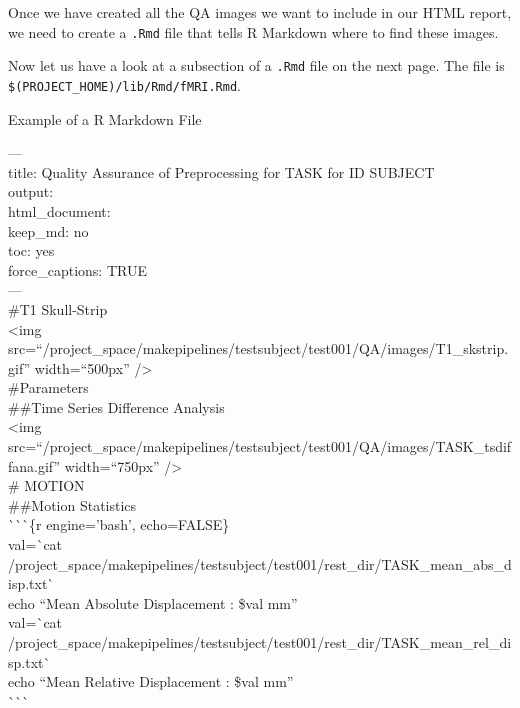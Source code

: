 Once we have created all the QA images we want to include in our HTML report, we need to create a \texttt{.Rmd} file that tells R Markdown where to find these images. 

Now let us have a look at a subsection of a \texttt{.Rmd} file on the next page. The file is \texttt{\$(PROJECT\_HOME)/lib/Rmd/fMRI.Rmd}. 

\begin{bash}{Example of a R Markdown File}{}

--- \\
title: Quality Assurance of Preprocessing for TASK for ID SUBJECT \\
output: \\
  html\_document: \\
    keep\_md: no \\
    toc: yes \\
    force\_captions: TRUE \\
--- \\
\#T1 Skull-Strip \\

<img src=``/project\_space/makepipelines/testsubject/test001/QA/images/T1\_skstrip.gif'' width=``500px'' /> \\

\#Parameters \\

\#\#Time Series Difference Analysis \\

<img src=``/project\_space/makepipelines/testsubject/test001/QA/images/TASK\_tsdiffana.gif'' width=``750px'' /> \\

\# MOTION \\

\#\#Motion Statistics \\

\`{}\`{}\`{}\{r engine='bash', echo=FALSE\} \\
val=\`{}cat /project\_space/makepipelines/testsubject/test001/rest\_dir/TASK\_mean\_abs\_disp.txt\`{} \\
echo ``Mean Absolute Displacement : \$val mm'' \\
val=\`{}cat /project\_space/makepipelines/testsubject/test001/rest\_dir/TASK\_mean\_rel\_disp.txt\`{} \\
echo ``Mean Relative Displacement : \$val mm'' \\
\`{}\`{}\`{} \\

\end{bash}

